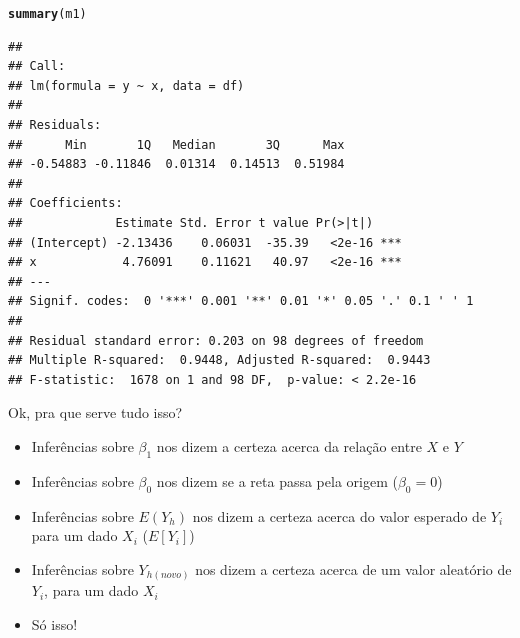 \documentclass{beamer}\usepackage[]{graphicx}\usepackage[]{color}
\makeatletter
\newcommand{\hlstd}[1]{\textcolor[rgb]{0.345,0.345,0.345}{#1}}%
\newcommand{\hlkwd}[1]{\textcolor[rgb]{0.737,0.353,0.396}{\textbf{#1}}}%
\newenvironment{kframe}{%
 \def\at@end@of@kframe{}%
 \ifinner\ifhmode%
  \def\at@end@of@kframe{\end{minipage}}%
  \begin{minipage}{\columnwidth}%
 \fi\fi%
 \def\FrameCommand##1{\hskip\@totalleftmargin \hskip-\fboxsep
 \colorbox{shadecolor}{##1}\hskip-\fboxsep
     \hskip-\linewidth \hskip-\@totalleftmargin \hskip\columnwidth}%
 \MakeFramed {\advance\hsize-\width
   \@totalleftmargin\z@ \linewidth\hsize
   \@setminipage}}%
 {\par\unskip\endMakeFramed%
 \at@end@of@kframe}
\newenvironment{knitrout}{}{} %
\renewenvironment{knitrout}{\setlength{\topsep}{0mm}}{}
\makeatother
\begin{document}
 
\begin{frame}[fragile]

\begin{knitrout}\tiny
{}\color{fgcolor}\begin{kframe}
\begin{alltt}
\hlkwd{summary}\hlstd{(m1)}
\end{alltt}
\begin{verbatim}
## 
## Call:
## lm(formula = y ~ x, data = df)
## 
## Residuals:
##      Min       1Q   Median       3Q      Max 
## -0.54883 -0.11846  0.01314  0.14513  0.51984 
## 
## Coefficients:
##             Estimate Std. Error t value Pr(>|t|)    
## (Intercept) -2.13436    0.06031  -35.39   <2e-16 ***
## x            4.76091    0.11621   40.97   <2e-16 ***
## ---
## Signif. codes:  0 '***' 0.001 '**' 0.01 '*' 0.05 '.' 0.1 ' ' 1
## 
## Residual standard error: 0.203 on 98 degrees of freedom
## Multiple R-squared:  0.9448,	Adjusted R-squared:  0.9443 
## F-statistic:  1678 on 1 and 98 DF,  p-value: < 2.2e-16
\end{verbatim}
\end{kframe}
\end{knitrout}

\end{frame}


\begin{frame}{Ok, pra que serve tudo isso?}

\begin{itemize}
 \item Inferências sobre $\beta _1$ nos dizem a certeza acerca da relação entre $X$ e $Y$  \pause
\vfill
\item Inferências sobre $\beta _0$ nos dizem se a reta passa pela origem ($\beta _0 = 0$) \pause
\vfill
\item Inferências sobre $E(Y_h)$ nos dizem a certeza acerca do valor esperado de $Y_i$ para um dado $X_i$ ($E[Y_i]$) \pause
\vfill
\item Inferências sobre $Y_{h(novo)}$ nos dizem a certeza acerca de um valor aleatório de $Y_i$, para um dado $X_i$ \pause
\vfill
\item Só isso!
\end{itemize}
\end{frame}
\end{document}
